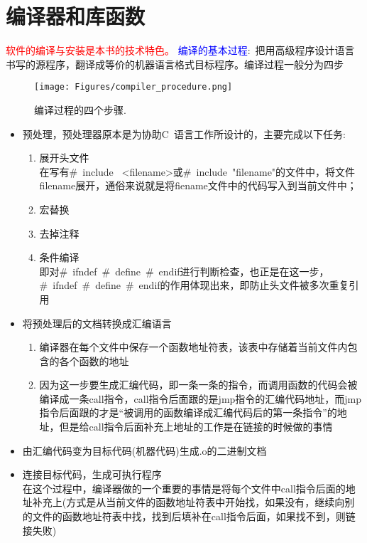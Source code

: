\documentclass{article}      %
\begin{document}
\section{编译器和库函数}
\textcolor{red}{软件的编译与安装是本书的技术特色。}
\textcolor{blue}{编译的基本过程}:~把用高级程序设计语言书写的源程序，翻译成等价的机器语言格式目标程序。编译过程一般分为四步
\begin{figure}[h!]
\centering
\texttt{[image: Figures/compiler\_procedure.png]}
\caption{\small \textrm{编译过程的四个步骤}.}%
\label{Fig:compiler}
\end{figure}
\begin{itemize}
	\item 预处理，预处理器原本是为协助\textrm{C~}语言工作所设计的，主要完成以下任务:
		\begin{enumerate}
			\item 展开头文件\\
				在写有\textrm{\#~include~ <filename>}或\textrm{\#~include~"filename"}的文件中，将文件\textrm{filename}展开，通俗来说就是将\textrm{fiename}文件中的代码写入到当前文件中；
			\item 宏替换
			\item 去掉注释
			\item 条件编译\\
				即对\textrm{$\#$~ifndef~\#~define~\#~endif}进行判断检查，也正是在这一步，\textrm{\#~ifndef~\#~define~\#~endif}的作用体现出来，即防止头文件被多次重复引用
		\end{enumerate}
	\item 将预处理后的文档转换成汇编语言
		\begin{enumerate}
			\item 编译器在每个文件中保存一个函数地址符表，该表中存储着当前文件内包含的各个函数的地址
			\item 因为这一步要生成汇编代码，即一条一条的指令，而调用函数的代码会被编译成一条\textrm{call}指令，\textrm{call}指令后面跟的是\textrm{jmp}指令的汇编代码地址，而\textrm{jmp}指令后面跟的才是“被调用的函数编译成汇编代码后的第一条指令”的地址，但是给\textrm{call}指令后面补充上地址的工作是在链接的时候做的事情
		\end{enumerate}
	\item 由汇编代码变为目标代码(机器代码)生成\textrm{.o}的二进制文档
	\item 连接目标代码，生成可执行程序\\
		在这个过程中，编译器做的一个重要的事情是将每个文件中\textrm{call}指令后面的地址补充上(方式是从当前文件的函数地址符表中开始找，如果没有，继续向别的文件的函数地址符表中找，找到后填补在\textrm{call}指令后面，如果找不到，则链接失败)

\end{itemize}
\end{document}
